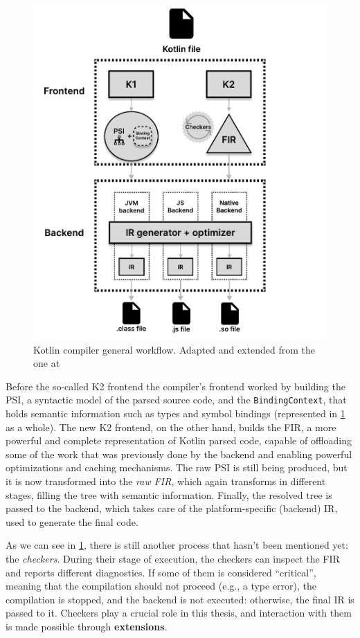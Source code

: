 \documentclass[12pt,a4paper,openright,twoside]{book}
\begin{document}
\begin{figure}
  \centering
  \includegraphics[width=.9\linewidth]{figures/kotlin-compiler-workflow.pdf}
  \caption{Kotlin compiler general workflow. Adapted and extended from the one
  at \cite{moskala2023}}
  \label{fig:kotlin-compiler-workflow}
\end{figure}

Before the so-called K2 frontend the compiler's frontend worked by
building the \ac{PSI}, a syntactic model of the parsed source code, and the
\lstinline{BindingContext}, that holds semantic information such as types and
symbol bindings (represented in \cref{fig:kotlin-compiler-workflow} as a whole). 
%
The new K2 frontend, on the other hand, builds the \ac{FIR}, a more powerful and
complete representation of Kotlin parsed code, capable of offloading some of the
work that was previously done by the backend and enabling powerful optimizations
and caching mechanisms. The raw \ac{PSI} is still being produced, but it is now
transformed into the \emph{raw FIR}, which again transforms in different stages,
filling the tree with semantic information. Finally, the resolved tree is passed
to the backend, which takes care of the platform-specific (backend) \ac{IR}, used
to generate the final code.

As we can see in \cref{fig:kotlin-compiler-workflow}, there is still another
process that hasn't been mentioned yet: the \emph{checkers}. During their stage
of execution, the checkers can inspect the \ac{FIR} and reports different
diagnostics. If some of them is considered ``critical'', meaning that the
compilation should not proceed (e.g., a type error), the compilation is stopped,
and the backend is not executed: otherwise, the final \ac{IR} is passed to it.
%
Checkers play a crucial role in this thesis, and interaction with them is made
possible through \textbf{extensions}.
\end{document}
